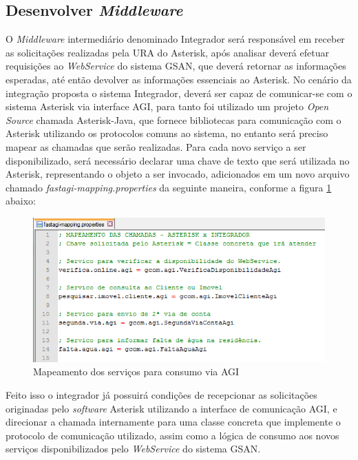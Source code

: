 \subsection{Desenvolver \textit{Middleware}}

O \textit{Middleware} intermediário denominado Integrador será responsável em receber as solicitações realizadas pela URA do Asterisk, após analisar deverá efetuar requisições ao \textit{WebService} do sistema GSAN, que deverá retornar as informações esperadas, até então devolver as informações essenciais ao Asterisk.
No cenário da integração proposta o sistema Integrador, deverá ser capaz de comunicar-se com o sistema Asterisk via interface AGI, para tanto foi utilizado um projeto \textit{Open Source} chamada Asterisk-Java, que fornece bibliotecas para comunicação com o Asterisk utilizando os protocolos comuns ao sistema, no entanto será preciso mapear as chamadas que serão realizadas.
Para cada novo serviço a ser disponibilizado, será necessário declarar uma chave de texto que será utilizada no Asterisk, representando o objeto a ser invocado, adicionados em um novo arquivo chamado \textit{fastagi-mapping.properties} da seguinte maneira, conforme a figura \ref{figura:mapeamenteServicosAGI} abaixo:

\begin{figure}[!htb]
	\centering
	\caption{Mapeamento dos serviços para consumo via AGI}
	\label{figura:mapeamenteServicosAGI}
	\includegraphics{figuras/mapeamento_servicos_agi.png}
\end{figure}


Feito isso o integrador já possuirá condições de recepcionar as solicitações originadas pelo \textit{software} Asterisk utilizando a interface de comunicação AGI, e direcionar a chamada internamente para uma classe concreta que implemente o protocolo de comunicação utilizado, assim como a lógica de consumo aos novos serviços disponibilizados pelo \textit{WebService} do sistema GSAN.

